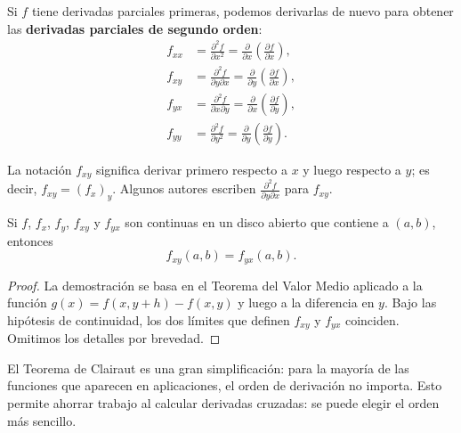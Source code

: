 
\begin{definition}
Si $f$ tiene derivadas parciales primeras, podemos derivarlas de
nuevo para obtener las \textbf{derivadas parciales de segundo orden}:
\[
\begin{aligned}
f_{xx} &= \frac{\partial^2 f}{\partial x^2}
       = \frac{\partial}{\partial x}\left(\frac{\partial f}{\partial x}\right),\\
f_{xy} &= \frac{\partial^2 f}{\partial y\partial x}
       = \frac{\partial}{\partial y}\left(\frac{\partial f}{\partial x}\right),\\
f_{yx} &= \frac{\partial^2 f}{\partial x\partial y}
       = \frac{\partial}{\partial x}\left(\frac{\partial f}{\partial y}\right),\\
f_{yy} &= \frac{\partial^2 f}{\partial y^2}
       = \frac{\partial}{\partial y}\left(\frac{\partial f}{\partial y}\right).
\end{aligned}
\]
\end{definition}

\begin{rem}
La notación $f_{xy}$ significa derivar primero respecto a $x$ y
luego respecto a $y$; es decir, $f_{xy}=(f_x)_y$. Algunos autores
escriben $\frac{\partial^2 f}{\partial y\partial x}$ para $f_{xy}$.
\end{rem}

\begin{theorem}
Si $f$, $f_x$, $f_y$, $f_{xy}$ y $f_{yx}$ son continuas en un disco
abierto que contiene a $(a,b)$, entonces
\[
f_{xy}(a,b) = f_{yx}(a,b).
\]
\end{theorem}

\begin{proof}
La demostración se basa en el Teorema del Valor Medio aplicado a la
función $g(x)=f(x,y+h)-f(x,y)$ y luego a la diferencia en $y$. Bajo
las hipótesis de continuidad, los dos límites que definen $f_{xy}$ y
$f_{yx}$ coinciden. Omitimos los detalles por brevedad.
\end{proof}

\begin{rem}
El Teorema de Clairaut es una gran simplificación: para la mayoría
de las funciones que aparecen en aplicaciones, el orden de derivación
no importa. Esto permite ahorrar trabajo al calcular derivadas
cruzadas: se puede elegir el orden más sencillo.
\end{rem}


